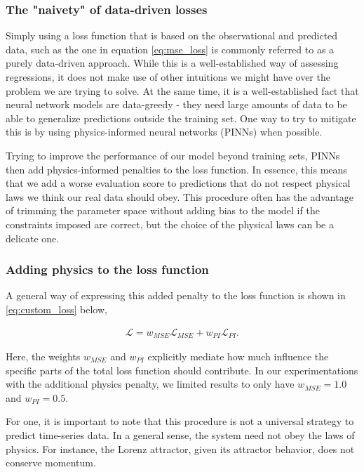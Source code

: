 \subsubsection{The "naivety" of data-driven losses}

Simply using a loss function that is based on the observational and predicted data, such as the one in equation \eqref{eq:mse_loss} is commonly referred to as a purely data-driven approach. While this is a well-established way of assessing regressions, it does not make use of other intuitions we might have over the problem we are trying to solve. At the same time, it is a well-established fact that neural network models are data-greedy - they need large amounts of data to be able to generalize predictions outside the training set. One way to try to mitigate this is by using  physics-informed neural networks (PINNs) when possible.

Trying to improve the performance of our model beyond training sets, PINNs then add physics-informed penalties to the loss function. In essence, this means that we add a worse evaluation score to predictions that do not respect physical laws we think our real data should obey. This procedure often has the advantage of trimming the parameter space without adding bias to the model if the constraints imposed are correct, but the choice of the physical laws can be a delicate one. 


\subsubsection{Adding physics to the loss function}

A general way of expressing this added penalty to the loss function is shown in \eqref{eq:custom_loss} below,

\begin{align}
    \mathcal{L} = w_{MSE}\mathcal{L}_{MSE} + w_{PI}\mathcal{L}_{PI}.
    \label{eq:custom_loss}
\end{align}

Here, the weights $w_{MSE}$ and $w_{PI}$ explicitly mediate how much influence the specific parts of the total loss function should contribute. In our experimentations with the additional physics penalty, we limited results to only have $w_{MSE} = 1.0$ and $w_{PI}= 0.5$.

For one, it is important to note that this procedure is not a universal strategy to predict time-series data. In a general sense, the system need not obey the laws of physics. For instance, the Lorenz attractor, given its attractor behavior, does not conserve momentum.

